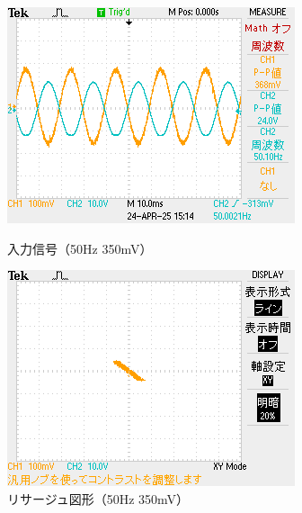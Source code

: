 \documentclass{jlreq}
\numberwithin{equation}{section}
\begin{document}
\begin{figure}[H]
  \centering
  \begin{minipage}{0.45\textwidth}
    \centering
    \includegraphics[width=\textwidth]{clip_350mV_YT.png}
    \caption{入力信号（50Hz 350mV）}
  \end{minipage}
  \hfill
  \begin{minipage}{0.45\textwidth}
    \centering
    \includegraphics[width=\textwidth]{clip_350mV_XY.png}
    \caption{リサージュ図形（50Hz 350mV）}
  \end{minipage}
\end{figure}
\end{document}
